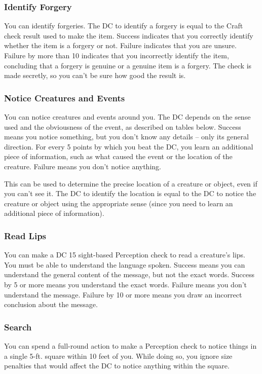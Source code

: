 \subsubsection{Identify Forgery}
You can identify forgeries. The DC to identify a forgery is equal to the Craft check result used to make the item. Success indicates that you correctly identify whether the item is a forgery or not. Failure indicates that you are unsure. Failure by more than 10 indicates that you incorrectly identify the item, concluding that a forgery is genuine or a genuine item is a forgery. The check is made secretly, so you can't be sure how good the result is.

\subsubsection{Notice Creatures and Events}
You can notice creatures and events around you. The DC depends on the sense used and the obviousness of the event, as described on tables below. Success means you notice something, but you don't know any details -- only its general direction. For every 5 points by which you beat the DC, you learn an additional piece of information, such as what caused the event or the location of the creature. Failure means you don't notice anything.

This can be used to determine the precise location of a creature or object, even if you can't see it. The DC to identify the location is equal to the DC to notice the creature or object using the appropriate sense  (since you need to learn an additional piece of information).

\subsubsection{Read Lips}
You can make a DC 15 sight-based Perception check to read a creature's lips. You must be able to understand the language spoken. Success means you can understand the general content of the message, but not the exact words. Success by 5 or more means you understand the exact words. Failure means you don't understand the message. Failure by 10 or more means you draw an incorrect conclusion about the message.

\subsubsection{Search}\label{Search}
You can spend a full-round action to make a Perception check to notice things in a single 5-ft. square within 10 feet of you. While doing so, you ignore size penalties that would affect the DC to notice anything within the square.

